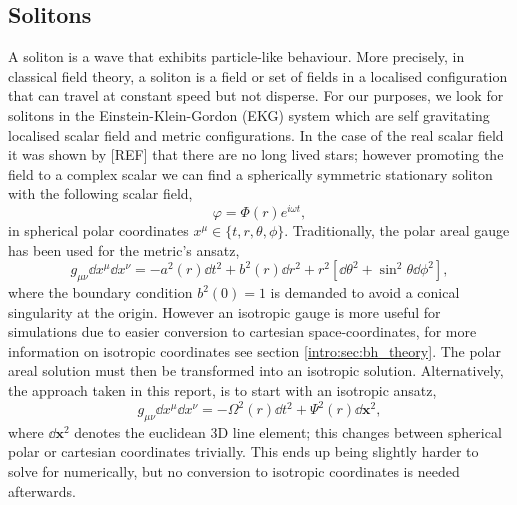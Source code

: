 \subsection{Solitons}
A soliton is a wave that exhibits particle-like behaviour. More precisely, in classical field theory, a soliton
is a field or set of fields in a localised configuration that can travel at constant speed but not disperse. For
our purposes, we look for solitons in the Einstein-Klein-Gordon (EKG) system which are self gravitating
localised scalar field and metric configurations. In the case of the real scalar field it was shown by [REF] that
there are no long lived stars; however promoting the field to a complex scalar we can find a spherically
symmetric stationary soliton with the following scalar field,
\begin{equation} \varphi = \Phi(r)e^{i\omega t}, \label{boson:eq:fieldansatz} \end{equation}
in spherical polar coordinates $x^\mu \in \{t,r,\theta,\phi \}$.
Traditionally, the polar areal gauge has been used for the metric's ansatz,
\begin{equation}g_{\mu\nu}\dd x^\mu \dd x^\nu =- a^2(r)\dd t^2 + b^2(r) \dd r^2 + r^2 \left[ \dd \theta^2 + \sin^2\theta \dd \phi^2\right],\label{boson:eq:polaransatz}\end{equation}
where the boundary condition $b^2(0)=1$ is demanded to avoid a conical singularity at the origin. However an isotropic gauge is more useful for simulations due to easier conversion to cartesian space-coordinates, for more information on isotropic coordinates see section \ref{intro:sec:bh_theory}. The polar areal solution must then be transformed into an isotropic solution. Alternatively, the approach taken in this report, is to start with an isotropic ansatz,
\begin{equation} g_{\mu\nu}\dd x^\mu \dd x^\nu =- \Omega^2(r)\dd t^2 + \Psi^2(r)\dd \bm{x}^2,\label{boson:eq:metricansatz}\end{equation}
where $\dd \bm{x}^2$ denotes the euclidean 3D line element; this changes between spherical polar or cartesian coordinates trivially. This ends up being slightly harder to solve for numerically, but no conversion to isotropic coordinates is needed afterwards.

